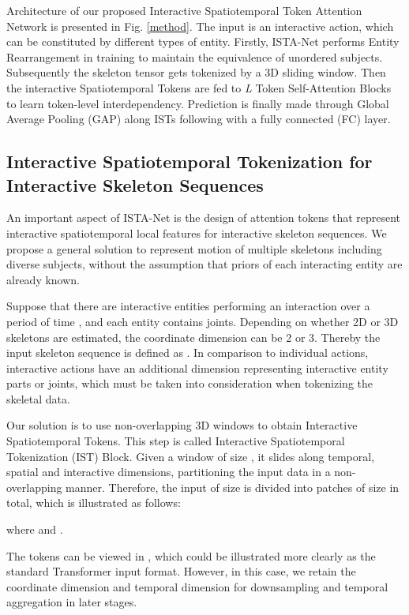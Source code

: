 \documentclass[letterpaper, 10 pt, conference]{ieeeconf}
\begin{document}
Architecture of our proposed Interactive Spatiotemporal Token Attention Network is presented in Fig. \ref{method}. The input is an interactive action, which can be constituted by different types of entity. Firstly, ISTA-Net performs Entity Rearrangement in training to maintain the equivalence of unordered subjects. Subsequently the skeleton tensor gets tokenized by a 3D sliding window. Then the interactive Spatiotemporal Tokens are fed to \textit{L} Token Self-Attention Blocks to learn token-level interdependency. Prediction is finally made through Global Average Pooling (GAP) along ISTs following with a fully connected (FC) layer.

\subsection{Interactive Spatiotemporal Tokenization for Interactive Skeleton Sequences}

An important aspect of ISTA-Net is the design of attention tokens that represent interactive spatiotemporal local features for interactive skeleton sequences. We propose a general solution to represent motion of multiple skeletons including diverse subjects, without the assumption that priors of each interacting entity are already known.

Suppose that there are  interactive entities performing an interaction over a period of time , and each entity contains  joints. Depending on whether 2D or 3D skeletons are estimated, the coordinate dimension  can be 2 or 3. Thereby the input skeleton sequence is defined as . In comparison to individual actions, interactive actions have an additional dimension  representing interactive entity parts or joints, which must be taken into consideration when tokenizing the skeletal data.

Our solution is to use non-overlapping 3D windows to obtain Interactive Spatiotemporal Tokens. This step is called Interactive Spatiotemporal Tokenization (IST) Block. Given a window  of size , it slides along temporal, spatial and interactive dimensions, partitioning the input data in a non-overlapping manner. Therefore, the input of size  is divided into  patches of size  in total, which is illustrated as follows:

where  and .

The tokens  can be viewed in , which could be illustrated more clearly as the standard Transformer input format. However, in this case, we retain the coordinate dimension  and temporal dimension  for downsampling and temporal aggregation in later stages.
\end{document}
